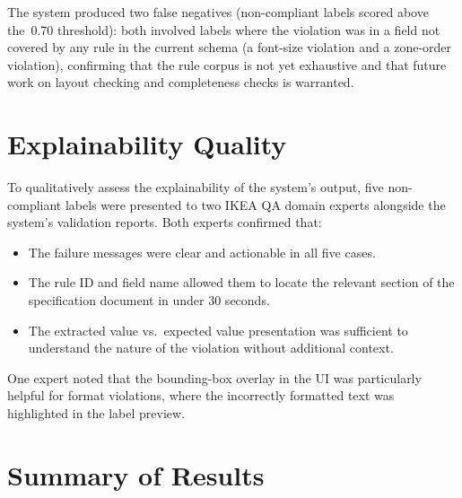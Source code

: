 The system produced two false negatives (non-compliant labels scored above the~0.70
threshold): both involved labels where the violation was in a field not covered by any rule
in the current schema (a font-size violation and a zone-order violation), confirming that
the rule corpus is not yet exhaustive and that future work on layout checking and completeness
checks is warranted.

\section{Explainability Quality}

To qualitatively assess the explainability of the system's output, five non-compliant labels
were presented to two IKEA \ac{QA} domain experts alongside the system's validation
reports. Both experts confirmed that:

\begin{itemize}
  \item The failure messages were clear and actionable in all five cases.
  \item The rule ID and field name allowed them to locate the relevant section of the
  specification document in under 30 seconds.
  \item The extracted value vs.\ expected value presentation was sufficient to understand
  the nature of the violation without additional context.
\end{itemize}

One expert noted that the bounding-box overlay in the \ac{UI} was particularly helpful for
format violations, where the incorrectly formatted text was highlighted in the label preview.

\section{Summary of Results}

